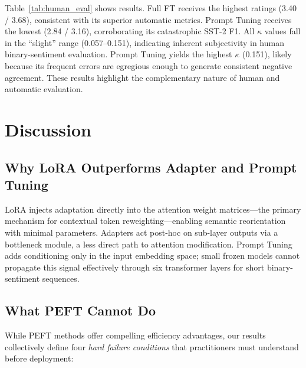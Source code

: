 \documentclass[conference]{IEEEtran}
\begin{document}
Table~\ref{tab:human_eval} shows results. Full FT receives the highest ratings (3.40 / 3.68), consistent with its superior automatic metrics. Prompt Tuning receives the lowest (2.84 / 3.16), corroborating its catastrophic SST-2 F1. All $\kappa$ values fall in the ``slight'' range (0.057--0.151), indicating inherent subjectivity in human binary-sentiment evaluation. Prompt Tuning yields the highest $\kappa$ (0.151), likely because its frequent errors are egregious enough to generate consistent negative agreement. These results highlight the complementary nature of human and automatic evaluation.

\section{Discussion}
\label{sec:discussion}

\subsection{Why LoRA Outperforms Adapter and Prompt Tuning}

LoRA injects adaptation directly into the attention weight matrices---the primary mechanism for contextual token reweighting---enabling semantic reorientation with minimal parameters. Adapters act post-hoc on sub-layer outputs via a bottleneck module, a less direct path to attention modification. Prompt Tuning adds conditioning only in the input embedding space; small frozen models cannot propagate this signal effectively through six transformer layers for short binary-sentiment sequences.

\subsection{What PEFT Cannot Do}

While PEFT methods offer compelling efficiency advantages, our results collectively define four \emph{hard failure conditions} that practitioners must understand before deployment:
\end{document}
